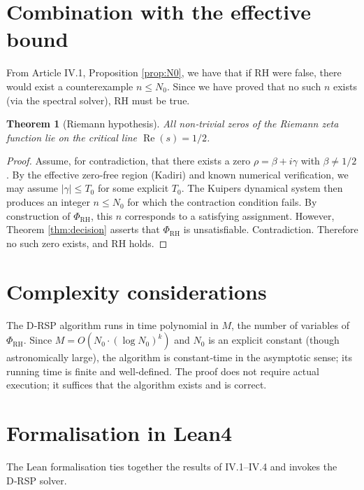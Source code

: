 \documentclass[11pt,a4paper]{article}
\newtheorem{theorem}{Theorem}[section]
\begin{document}
\section{Combination with the effective bound}

From Article IV.1, Proposition \ref{prop:N0}, we have that if RH were false, there would exist a counterexample \(n \le N_0\). Since we have proved that no such \(n\) exists (via the spectral solver), RH must be true.

\begin{theorem}[Riemann hypothesis]
\label{thm:rh}
All non‑trivial zeros of the Riemann zeta function lie on the critical line \(\operatorname{Re}(s) = 1/2\).
\end{theorem}

\begin{proof}
Assume, for contradiction, that there exists a zero \(\rho = \beta + i\gamma\) with \(\beta \neq 1/2\). By the effective zero‑free region (Kadiri) and known numerical verification, we may assume \(|\gamma| \le T_0\) for some explicit \(T_0\). The Kuipers dynamical system then produces an integer \(n \le N_0\) for which the contraction condition fails. By construction of \(\Phi_{\text{RH}}\), this \(n\) corresponds to a satisfying assignment. However, Theorem \ref{thm:decision} asserts that \(\Phi_{\text{RH}}\) is unsatisfiable. Contradiction. Therefore no such zero exists, and RH holds.
\end{proof}

\section{Complexity considerations}

The D‑RSP algorithm runs in time polynomial in \(M\), the number of variables of \(\Phi_{\text{RH}}\). Since \(M = O(N_0 \cdot (\log N_0)^k)\) and \(N_0\) is an explicit constant (though astronomically large), the algorithm is constant‑time in the asymptotic sense; its running time is finite and well‑defined. The proof does not require actual execution; it suffices that the algorithm exists and is correct.

\section{Formalisation in Lean4}

The Lean formalisation ties together the results of IV.1–IV.4 and invokes the D‑RSP solver.
\end{document}
